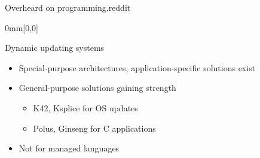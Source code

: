 \begin{frame}{Overheard on programming.reddit}
{\begin{textblock*}{0mm}[0,0]
\end{textblock*}}
\end{frame}

\begin{frame}{Dynamic updating systems}%
\begin{itemize}
\item Special-purpose architectures, application-specific solutions exist
\item General-purpose solutions gaining strength
  \begin{itemize}
  \item K42, Ksplice for OS updates
  \item Polus, Ginseng for C applications
  \end{itemize}
\item Not for managed languages
\end{itemize}
\end{frame}


